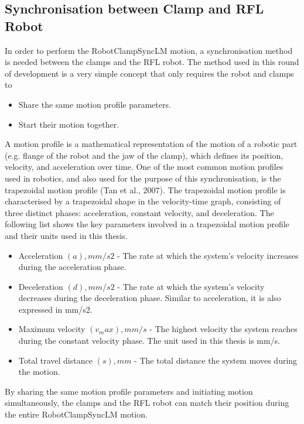 \subsection{Synchronisation between Clamp and RFL Robot}
\label{subsection:exploration_2_synchronisation_between_clamp_and_rfl_robot}

In order to perform the RobotClampSyncLM motion, a synchronisation method is needed between the clamps and the RFL robot. The method used in this round of development is a very simple concept that only requires the robot and clamps to
\begin{itemize}
    \item Share the same motion profile parameters.
    \item Start their motion together.
\end{itemize}
    A motion profile is a mathematical representation of the motion of a robotic part (e.g. flange of the robot and the jaw of the clamp), which defines its position, velocity, and acceleration over time. One of the most common motion profiles used in robotics, and also used for the purpose of this synchronisation, is the trapezoidal motion profile (Tan et al., 2007).
The trapezoidal motion profile is characterised by a trapezoidal shape in the velocity-time graph, consisting of three distinct phases: acceleration, constant velocity, and deceleration. The following list shows the key parameters involved in a trapezoidal motion profile and their units used in this thesis.
\begin{itemize}
    \item Acceleration $(a), mm/s2$ - The rate at which the system's velocity increases during the acceleration phase. 
    \item Deceleration $(d), mm/s2$ - The rate at which the system's velocity decreases during the deceleration phase. Similar to acceleration, it is also expressed in mm/s2. 
    \item Maximum velocity $(v_max), mm/s$ - The highest velocity the system reaches during the constant velocity phase. The unit used in this thesis is mm/s. 
    \item Total travel distance $(s), mm$ - The total distance the system moves during the motion. 
\end{itemize}

By sharing the same motion profile parameters and initiating motion simultaneously, the clamps and the RFL robot can match their position during the entire RobotClampSyncLM motion.

